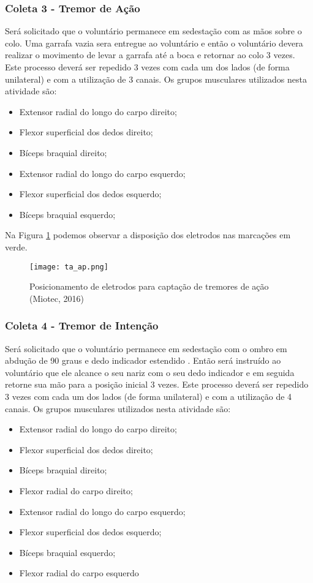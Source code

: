 \documentclass[a4paper,12pt]{report}
\begin{document}
\subsubsection*{Coleta 3 - Tremor de Ação}

Será solicitado que o voluntário permanece em sedestação com as mãos sobre o colo. Uma garrafa vazia sera entregue ao voluntário e então o voluntário devera realizar o movimento de levar a garrafa até a boca e retornar ao colo 3 vezes. Este processo deverá ser repedido 3 vezes com cada um dos lados (de forma unilateral) e com a utilização de 3 canais. Os grupos musculares utilizados nesta atividade são: 

\begin{itemize}
\item Extensor radial do longo do carpo direito;
\item Flexor superficial dos dedos direito;
\item Bíceps braquial direito;
\item Extensor radial do longo do carpo esquerdo;
\item Flexor superficial dos dedos esquerdo;
\item Bíceps braquial esquerdo;
\end{itemize}

Na Figura \ref{fig4} podemos observar a disposição dos eletrodos nas marcações em verde.

\begin{figure}[!h]
\centering
\texttt{[image: ta\_ap.png]}
\caption{Posicionamento de eletrodos para captação de tremores de ação (Miotec, 2016)}\label{fig4}
\end{figure}



\subsubsection*{Coleta 4 - Tremor de Intenção}

Será solicitado que o voluntário permanece em sedestação com o ombro em abdução de 90 graus e dedo indicador estendido . Então será instruído ao voluntário que ele alcance o seu nariz com o seu dedo indicador e em seguida retorne sua mão para a posição inicial 3 vezes. Este processo deverá ser repedido 3 vezes com cada um dos lados (de forma unilateral) e com a utilização de 4 canais. Os grupos musculares utilizados nesta atividade são: 

\begin{itemize}
\item Extensor radial do longo do carpo direito;
\item Flexor superficial dos dedos direito;
\item Bíceps braquial direito;
\item Flexor radial do carpo direito;
\item Extensor radial do longo do carpo esquerdo;
\item Flexor superficial dos dedos esquerdo;
\item Bíceps braquial esquerdo;
\item Flexor radial do carpo esquerdo
\end{itemize}
\end{document}
